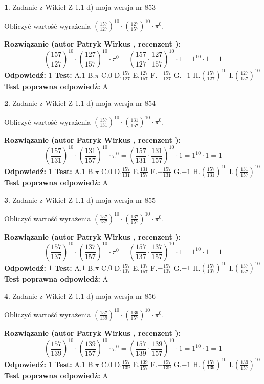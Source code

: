 \documentclass[12pt, a4paper]{article}
\theoremstyle{definition} %
\newtheorem{zad}{}
\newcommand{\zadStart}[1]{\begin{zad}#1\newline}
\newcommand{\zadStop}{\end{zad}}
\newcommand{\rozwStart}[2]{\noindent \textbf{Rozwiązanie (autor #1 , recenzent #2): }\newline}
\newcommand{\rozwStop}{\newline}
\newcommand{\odpStart}{\noindent \textbf{Odpowiedź:}\newline}
\newcommand{\odpStop}{\newline}
\newcommand{\testStart}{\noindent \textbf{Test:}\newline}
\newcommand{\testStop}{\newline}
\newcommand{\kluczStart}{\noindent \textbf{Test poprawna odpowiedź:}\newline}
\newcommand{\kluczStop}{\newline}
\begin{document}
\zadStart{Zadanie z Wikieł Z 1.1 d) moja wersja nr 853}

Obliczyć wartość wyrażenia $(\frac{157}{127})^{10} \cdot (\frac{127}{157})^{10} \cdot \pi^{0}$.
\zadStop
\rozwStart{Patryk Wirkus}{}
$$(\frac{157}{127})^{10} \cdot (\frac{127}{157})^{10} \cdot \pi^{0} = (\frac{157}{127} \cdot \frac{127}{157})^{10} \cdot 1 = 1^{10} \cdot 1 = 1$$
\rozwStop
\odpStart
$1$
\odpStop
\testStart
A.$1$ B.$\pi$ C.$0$ D.$\frac{157}{127}$ E.$\frac{127}{157}$
F.$-\frac{157}{127}$ G.$-1$
H.$(\frac{157}{127})^{10}$
I.$(\frac{127}{157})^{10}$
\testStop
\kluczStart
A
\kluczStop



\zadStart{Zadanie z Wikieł Z 1.1 d) moja wersja nr 854}

Obliczyć wartość wyrażenia $(\frac{157}{131})^{10} \cdot (\frac{131}{157})^{10} \cdot \pi^{0}$.
\zadStop
\rozwStart{Patryk Wirkus}{}
$$(\frac{157}{131})^{10} \cdot (\frac{131}{157})^{10} \cdot \pi^{0} = (\frac{157}{131} \cdot \frac{131}{157})^{10} \cdot 1 = 1^{10} \cdot 1 = 1$$
\rozwStop
\odpStart
$1$
\odpStop
\testStart
A.$1$ B.$\pi$ C.$0$ D.$\frac{157}{131}$ E.$\frac{131}{157}$
F.$-\frac{157}{131}$ G.$-1$
H.$(\frac{157}{131})^{10}$
I.$(\frac{131}{157})^{10}$
\testStop
\kluczStart
A
\kluczStop



\zadStart{Zadanie z Wikieł Z 1.1 d) moja wersja nr 855}

Obliczyć wartość wyrażenia $(\frac{157}{137})^{10} \cdot (\frac{137}{157})^{10} \cdot \pi^{0}$.
\zadStop
\rozwStart{Patryk Wirkus}{}
$$(\frac{157}{137})^{10} \cdot (\frac{137}{157})^{10} \cdot \pi^{0} = (\frac{157}{137} \cdot \frac{137}{157})^{10} \cdot 1 = 1^{10} \cdot 1 = 1$$
\rozwStop
\odpStart
$1$
\odpStop
\testStart
A.$1$ B.$\pi$ C.$0$ D.$\frac{157}{137}$ E.$\frac{137}{157}$
F.$-\frac{157}{137}$ G.$-1$
H.$(\frac{157}{137})^{10}$
I.$(\frac{137}{157})^{10}$
\testStop
\kluczStart
A
\kluczStop



\zadStart{Zadanie z Wikieł Z 1.1 d) moja wersja nr 856}

Obliczyć wartość wyrażenia $(\frac{157}{139})^{10} \cdot (\frac{139}{157})^{10} \cdot \pi^{0}$.
\zadStop
\rozwStart{Patryk Wirkus}{}
$$(\frac{157}{139})^{10} \cdot (\frac{139}{157})^{10} \cdot \pi^{0} = (\frac{157}{139} \cdot \frac{139}{157})^{10} \cdot 1 = 1^{10} \cdot 1 = 1$$
\rozwStop
\odpStart
$1$
\odpStop
\testStart
A.$1$ B.$\pi$ C.$0$ D.$\frac{157}{139}$ E.$\frac{139}{157}$
F.$-\frac{157}{139}$ G.$-1$
H.$(\frac{157}{139})^{10}$
I.$(\frac{139}{157})^{10}$
\testStop
\kluczStart
A
\kluczStop
\end{document}
